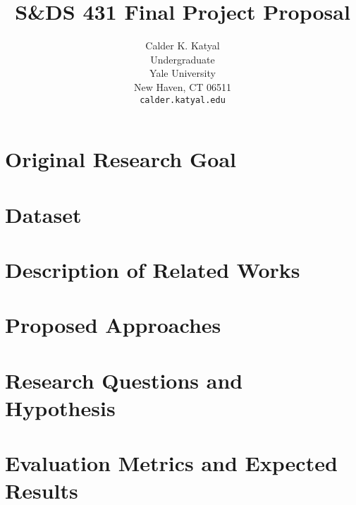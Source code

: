 \documentclass{article}
\title{S\&DS 431 Final Project Proposal}
\author{%
  Calder K. Katyal\\
  Undergraduate\\
  Yale University\\
  New Haven, CT 06511 \\
  \texttt{calder.katyal.edu} \\
}
\begin{document}
\maketitle

\section{Original Research Goal}


\section{Dataset}

\section{Description of Related Works}

\section{Proposed Approaches}

\section{Research Questions and Hypothesis}

\section{Evaluation Metrics and Expected Results}

\FloatBarrier

\newpage

\small


\end{document}
